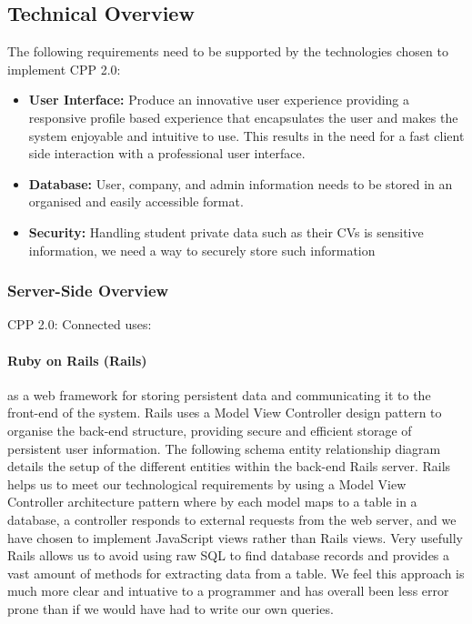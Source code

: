 \subsection{Technical Overview}
	The following requirements need to be supported by the technologies chosen to implement CPP 2.0:
		\begin{itemize}
		  \item \textbf{User Interface:} Produce an innovative user experience providing a responsive profile based experience that encapsulates the user and makes the system enjoyable and intuitive to use. This results in the need for a fast client side interaction with a professional user interface.
		  \item \textbf{Database:} User, company, and admin information needs to be stored in an organised and easily accessible format.
		  \item \textbf{Security:} Handling student private data such as their CVs is sensitive information, we need a way to securely store such information 
		\end{itemize} 

	\subsubsection{Server-Side Overview}
		CPP 2.0: Connected uses:
		\paragraph{Ruby on Rails (Rails)\cite{ror}} as a web framework for storing persistent data and communicating it to the front-end of the system. Rails uses a Model View Controller design pattern to organise the back-end structure, providing secure and efficient storage of persistent user information. The following schema entity relationship diagram details the setup of the different entities within the back-end Rails server.
		Rails helps us to meet our technological requirements by using a Model View Controller architecture pattern where by each model maps to a table in a database, a controller responds to external requests from the web server, and we have chosen to implement JavaScript views rather than Rails views.
		Very usefully Rails allows us to avoid using raw SQL to find database records and provides a vast amount of methods for extracting data from a table. We feel this approach is much more clear and intuative to a programmer and has overall been less error prone than if we would have had to write our own queries. %

